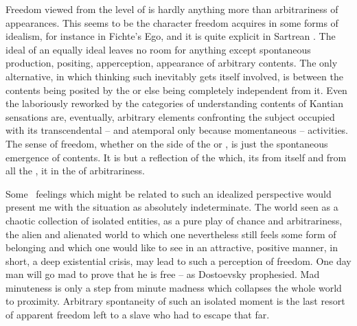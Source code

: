 \pa \imm %
Freedom viewed from the level of  is hardly anything
more than arbitrariness of appearances.  This seems to be the character freedom
acquires in some forms of idealism, for instance in Fichte's Ego, and it is
quite explicit in Sartrean .  The ideal  of an
equally ideal  leaves no room for anything except spontaneous
production, positing, apperception, appearance of arbitrary contents.  The only
alternative, in which thinking such  inevitably gets itself
involved, is between the contents being posited by the  or else
being completely independent from it.  Even the laboriously reworked by the
categories of understanding contents of Kantian sensations are, eventually,
arbitrary elements confronting the subject occupied with its transcendental --
and atemporal only because momentaneous -- activities.  The sense of freedom,
whether on the side of the  or , is just the spontaneous
emergence of contents. It is but a reflection of the  which,
 its  from itself and from all the ,
 it in the  of arbitrariness.

Some \oo\ feelings which might be related to such an idealized perspective would
present me with the  situation as absolutely indeterminate.  The
world seen as a chaotic collection of isolated entities, as a pure play of
chance and arbitrariness, the alien and alienated world to which one
nevertheless still feels some form of belonging and which one would like to see
in an attractive, positive manner, in short, a deep existential crisis, may lead
to such a perception of freedom.  One day man will go mad to prove that he is
free -- as Dostoevsky prophesied. Mad minuteness is only
a step from minute madness which collapses the whole world to 
proximity.  Arbitrary spontaneity of such an isolated moment is the last resort
of apparent freedom left to a slave who had to escape that far.

